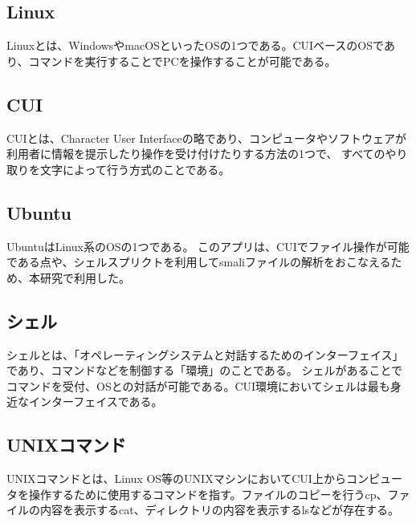 



\subsection{Linux}

Linuxとは、WindowsやmacOSといったOSの1つである。CUIベースのOSであり、コマンドを実行することでPCを操作することが可能である。


\subsection{CUI}
CUIとは、Character User Interfaceの略であり、コンピュータやソフトウェアが利用者に情報を提示したり操作を受け付けたりする方法の1つで、
すべてのやり取りを文字によって行う方式のことである。


\subsection{Ubuntu}
UbuntuはLinux系のOSの1つである。
このアプリは、CUIでファイル操作が可能である点や、シェルスプリクトを利用してsmaliファイルの解析をおこなえるため、本研究で利用した。


\subsection{シェル}
シェルとは、「オペレーティングシステムと対話するためのインターフェイス」であり、コマンドなどを制御する「環境」のことである。
シェルがあることでコマンドを受付、OSとの対話が可能である。CUI環境においてシェルは最も身近なインターフェイスである。


\subsection{UNIXコマンド}
UNIXコマンドとは、Linux OS等のUNIXマシンにおいてCUI上からコンピュータを操作するために使用するコマンドを指す。ファイルのコピーを行うcp、ファイルの内容を表示するcat、ディレクトリの内容を表示するlsなどが存在する。



